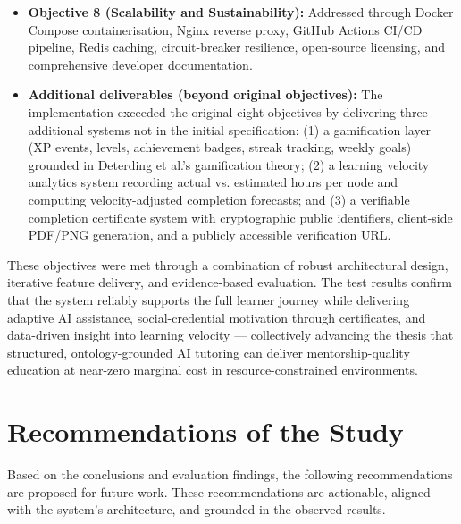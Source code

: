 \begin{itemize}
    \item \textbf{Objective 8 (Scalability and Sustainability):} Addressed through Docker Compose containerisation, Nginx reverse proxy, GitHub Actions CI/CD pipeline, Redis caching, circuit-breaker resilience, open-source licensing, and comprehensive developer documentation.
    \item \textbf{Additional deliverables (beyond original objectives):} The implementation exceeded the original eight objectives by delivering three additional systems not in the initial specification: (1) a gamification layer (XP events, levels, achievement badges, streak tracking, weekly goals) grounded in Deterding et al.'s gamification theory; (2) a learning velocity analytics system recording actual vs. estimated hours per node and computing velocity-adjusted completion forecasts; and (3) a verifiable completion certificate system with cryptographic public identifiers, client-side PDF/PNG generation, and a publicly accessible verification URL.
\end{itemize}

These objectives were met through a combination of robust architectural design, iterative feature delivery, and evidence-based evaluation. The test results confirm that the system reliably supports the full learner journey while delivering adaptive AI assistance, social-credential motivation through certificates, and data-driven insight into learning velocity --- collectively advancing the thesis that structured, ontology-grounded AI tutoring can deliver mentorship-quality education at near-zero marginal cost in resource-constrained environments.

\section{Recommendations of the Study}
\label{sec:recommendations}

Based on the conclusions and evaluation findings, the following recommendations are proposed for future work. These recommendations are actionable, aligned with the system's architecture, and grounded in the observed results.

